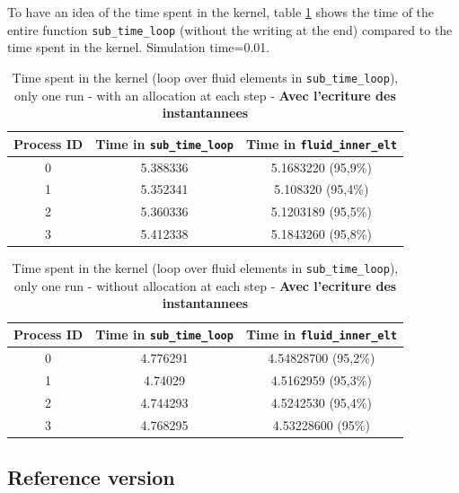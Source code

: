 \documentclass[10pt,twoside]{article}   	%
\begin{document}
To have an idea of the time spent in the kernel, table \ref{tab:7} shows the time of the entire function \texttt{sub\_time\_loop} (without the writing at the end) compared to the time spent in the kernel. Simulation time=0.01.

\begin{table}[H]
\centering
\caption{Time spent in the kernel (loop over fluid elements in {\tt sub\_time\_loop}), only one run - with an allocation at each step - {\bf{Avec l'ecriture des instantannees}}}
{\small
\begin{tabular}{|c|c|c|} \hline 
 {{\bf{Process ID}}} 	& {{\bf{Time in \texttt{sub\_time\_loop} }}}	& {{\bf{Time in \texttt{fluid\_inner\_elt} }}}\\ \hline \hline
		0		&   5.388336							&  5.1683220	(95,9\%)		\\ \hline 
 		1		&  5.352341							&  5.108320	(95,4\%)		\\ \hline
 		2		 &  5.360336							&  5.1203189	(95,5\%)		\\ \hline
		3		 &  5.412338 							&  5.1843260	(95,8\%)		\\ \hline	
\end{tabular}
}
\label{tab:7}
\end{table}

\begin{table}[H]
\centering
\caption{Time spent in the kernel (loop over fluid elements in {\tt sub\_time\_loop}), only one run - without allocation at each step - {\bf{Avec l'ecriture des instantannees}}}
{\small
\begin{tabular}{|c|c|c|} \hline 
 {{\bf{Process ID}}} 	& {{\bf{Time in \texttt{sub\_time\_loop} }}}	& {{\bf{Time in \texttt{fluid\_inner\_elt} }}}\\ \hline \hline
		0		&   4.776291							&  4.54828700	(95,2\%)		\\ \hline 
 		1		&  4.74029							&  4.5162959	(95,3\%)		\\ \hline
 		2		 &  4.744293							&  4.5242530	(95,4\%)		\\ \hline
		3		 & 4.768295 							&  4.53228600	(95\%)		\\ \hline	
\end{tabular}
}
\label{tab:8}
\end{table}


\subsection{Reference version}
\end{document}
